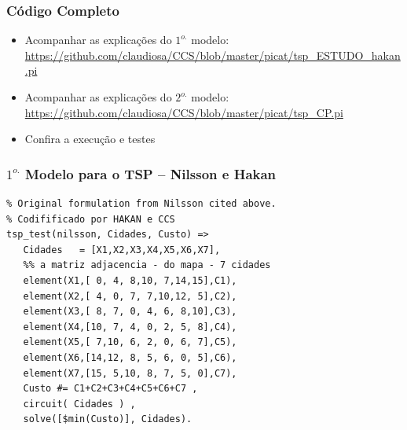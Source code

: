 \begin{frame}[fragile]
\frametitle{Código Completo}

\begin{itemize}
\item Acompanhar as explicações do $1^{o.}$ modelo:\\
\url{https://github.com/claudiosa/CCS/blob/master/picat/tsp_ESTUDO_hakan.pi}


\item Acompanhar as explicações do $2^{o.}$ modelo:\\
\url{https://github.com/claudiosa/CCS/blob/master/picat/tsp_CP.pi}


  \item Confira a execução e testes
\end{itemize}
\end{frame}

\begin{frame}[fragile]
\frametitle{$1^{o.}$ Modelo para o TSP -- Nilsson e Hakan}

\begin{footnotesize}
\begin{verbatim}
% Original formulation from Nilsson cited above.
% Codifificado por HAKAN e CCS
tsp_test(nilsson, Cidades, Custo) =>
   Cidades   = [X1,X2,X3,X4,X5,X6,X7],
   %% a matriz adjacencia - do mapa - 7 cidades
   element(X1,[ 0, 4, 8,10, 7,14,15],C1),
   element(X2,[ 4, 0, 7, 7,10,12, 5],C2),
   element(X3,[ 8, 7, 0, 4, 6, 8,10],C3),
   element(X4,[10, 7, 4, 0, 2, 5, 8],C4),
   element(X5,[ 7,10, 6, 2, 0, 6, 7],C5),
   element(X6,[14,12, 8, 5, 6, 0, 5],C6),
   element(X7,[15, 5,10, 8, 7, 5, 0],C7),
   Custo #= C1+C2+C3+C4+C5+C6+C7 ,
   circuit( Cidades ) ,
   solve([$min(Custo)], Cidades).
\end{verbatim}
\end{footnotesize}

\end{frame}

